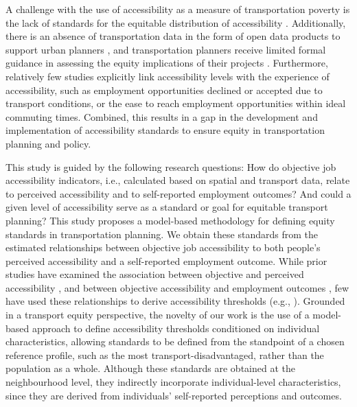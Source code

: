 \documentclass[preprint, 3p,
authoryear]{elsarticle} %
\begin{document}
A challenge with the use of accessibility as a measure of transportation
poverty is the lack of standards for the equitable distribution of
accessibility \citep{soukhov2025a}. Additionally, there is an absence of
transportation data in the form of open data products to support urban
planners \citep{arribas-bel2021, behrendtfrauke2021, páez2021}, and
transportation planners receive limited formal guidance in assessing the
equity implications of their projects
\citep{miller2018, palm2023, tebrömmelstroet2016}. Furthermore,
relatively few studies explicitly link accessibility levels with the
experience of accessibility, such as employment opportunities declined
or accepted due to transport conditions, or the ease to reach employment
opportunities within ideal commuting times. Combined, this results in a
gap in the development and implementation of accessibility standards to
ensure equity in transportation planning and policy.

This study is guided by the following research questions: How do
objective job accessibility indicators, i.e., calculated based on
spatial and transport data, relate to perceived accessibility and to
self-reported employment outcomes? And could a given level of
accessibility serve as a standard or goal for equitable transport
planning? This study proposes a model-based methodology for defining
equity standards in transportation planning. We obtain these standards
from the estimated relationships between objective job accessibility to
both people's perceived accessibility and a self-reported employment
outcome. While prior studies have examined the association between
objective and perceived accessibility
\citep{pot2021, lättman2016, zhu2025}, and between objective
accessibility and employment outcomes
\citep{bastiaanssen2021, duarte2023, jin2018, johnson2017, matas2010, kain1968, bania2008, delmelle2021, merlin2017, bastiaanssen2025},
few have used these relationships to derive accessibility thresholds
(e.g., \citet{negm2026}). Grounded in a transport equity perspective,
the novelty of our work is the use of a model-based approach to define
accessibility thresholds conditioned on individual characteristics,
allowing standards to be defined from the standpoint of a chosen
reference profile, such as the most transport-disadvantaged, rather than
the population as a whole. Although these standards are obtained at the
neighbourhood level, they indirectly incorporate individual-level
characteristics, since they are derived from individuals' self-reported
perceptions and outcomes.
\end{document}
